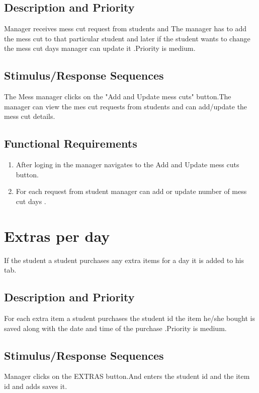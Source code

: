 \documentclass{scrreprt}
\begin{document}
\subsection{Description and Priority}
Manager receives mess cut request from students and The manager has to add the mess cut to that particular student and later if the student wants to change the mess cut days manager can update it .Priority is medium.

\subsection{Stimulus/Response Sequences}
The Mess manager clicks on the "Add and Update mess cuts" button.The manager can view the mes cut requests from students and can add/update the mess cut details.

\subsection{Functional Requirements}
\begin{enumerate}
\item After loging in the manager navigates to the Add and Update mess cuts  button.
\item For each request from student manager can add or update number of mess cut days .
\end{enumerate}

\section{Extras per day}
If the student a student purchases any extra items for a day it is added to his tab.


\subsection{Description and Priority}
For each extra item a student purchases the student id the item he/she bought is saved along with the date and time of the purchase .Priority is medium.

\subsection{Stimulus/Response Sequences}
Manager clicks on the EXTRAS button.And enters the student id and the item id and adds saves it.
\end{document}
